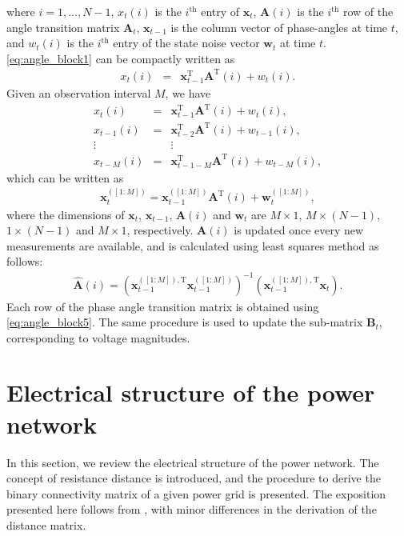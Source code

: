 \documentclass[10pt,journal,twocolumn]{IEEEtran}\IEEEoverridecommandlockouts
\begin{document}
where $i=1,\dots,N-1$, ${x}_{t}(i)$ is the $i^{\text{th}}$ entry of $\boldsymbol{x}_{t}$, $\boldsymbol{A}(i)$ is the $i^{\text{th}}$ row of the angle transition matrix $\boldsymbol{A}_{t}$, $\boldsymbol{x}_{t-1}$ is the column vector of phase-angles at time $t$, and ${w}_{t}(i)$ is the $i^{\text{th}}$ entry of the state noise vector $\boldsymbol{w}_{t}$ at time $t$. \eqref{eq:angle_block1} can be compactly written as
\begin{eqnarray}
{x}_{t}(i) &=& \boldsymbol{x}_{t-1}^{\mathrm{T}}\boldsymbol{A}^{\mathrm{T}}(i) + {w}_{t}(i).\label{eq:angle_block2}
\end{eqnarray}
Given an observation interval $M$, we have
\begin{eqnarray}
\nonumber {x}_{t}(i) &=& \boldsymbol{x}_{t-1}^{\mathrm{T}}\boldsymbol{A}^{\mathrm{T}}(i) + {w}_{t}(i),\\
{x}_{t-1}(i) &=& \boldsymbol{x}_{t-2}^{\mathrm{T}}\boldsymbol{A}^{\mathrm{T}}(i) + {w}_{t-1}(i),\label{eq:angle_block3}\\
\nonumber \vdots && \vdots \\
\nonumber {x}_{t-M}(i) &=& \boldsymbol{x}_{t-1-M}^{\mathrm{T}}\boldsymbol{A}^{\mathrm{T}}(i) + {w}_{t-M}(i),
\end{eqnarray}
which can be written as
\begin{eqnarray}\label{eq:state_updateM}
\boldsymbol{x}_{t}^{([1:M])} = \boldsymbol{x}_{t-1}^{([1:M])}\boldsymbol{A}^{\mathrm{T}}(i) + \boldsymbol{w}_{t}^{([1:M])}\label{eq:angle_block4},
\end{eqnarray}
where the dimensions of $\boldsymbol{x}_{t}$, $\boldsymbol{x}_{t-1}$, $\boldsymbol{A}(i)$ and $\boldsymbol{w}_{t}$ are $M\times 1$, $M\times (N-1)$, $1\times (N-1)$ and $M\times 1$, respectively. $\boldsymbol{A}(i)$ is updated once every new measurements are available, and is calculated using least squares method as follows:
\begin{eqnarray}
\hat{\boldsymbol{A}}(i) = \left(\boldsymbol{x}_{t-1}^{([1:M]),\mathrm{T}}\boldsymbol{x}_{t-1}^{([1:M])}\right)^{-1}
\left(\boldsymbol{x}_{t-1}^{([1:M]),\mathrm{T}}\boldsymbol{x}_{t}\right). \label{eq:angle_block5}
\end{eqnarray}
Each row of the phase angle transition matrix is obtained using \eqref{eq:angle_block5}. The same procedure is used to update the sub-matrix $\boldsymbol{B}_t$, corresponding to voltage magnitudes.

\section{Electrical structure of the power network}\label{sec:elec_structure}
In this section, we review the electrical structure of the power network. The concept of resistance distance is introduced, and the procedure to derive the binary connectivity matrix of a given power grid is presented. The exposition presented here follows from \cite[Section III]{Cotilla-Sanchez2012}, with minor differences in the derivation of the distance matrix.
\end{document}
